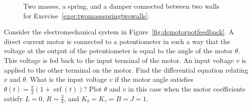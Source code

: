 \begin{excersizelist}
\begin{figure}[p]
\caption{Two masses, a spring, and a damper connected between two walls for Exercise~\ref{exer:twomassspringtwowalls}.} \label{mech:twomassspringtwowalls}
\end{figure}



\item \label{exer:dcmotorpotfeedback} Consider the electromechanical system in Figure~\ref{fig:dcmotorpotfeedback}.  A direct current motor is connected to a potentiometer in such a way that the voltage at the output of the potentiometer is equal to the angle of the motor $\theta$.  This voltage is fed back to the input terminal of the motor.  An input voltage $v$ is applied to the other terminal on the motor.  Find the differential equation relating $v$ and $\theta$.  What is the input voltage $v$ if the motor angle satisfies $\theta(t) = \frac{\pi}{2} (1 + \operatorname{erf}(t) )$?  Plot $\theta$ and $v$ in this case when the motor coefficients satisfy $L=0$, $R = \tfrac{3}{4}$, and $K_b=K_\tau=B=J=1$.


\end{excersizelist}
